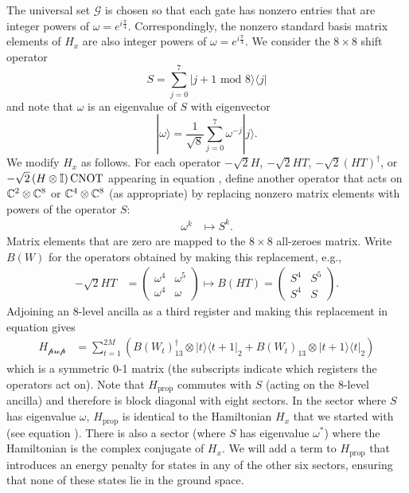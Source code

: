 \documentclass[../thesis-main/thesis-main]{subfiles}
\begin{document}
The universal set $\mathcal{G}$ is chosen so that each gate has nonzero entries that are integer powers of $\omega=e^{i\frac{\pi}{4}}$.  Correspondingly, the nonzero standard basis matrix elements of $H_{x}$ are also integer powers of $\omega=e^{i\frac{\pi}{4}}$. We consider the $8\times8$ shift operator
\[
S=\sum_{j=0}^{7}|j+1\text{ mod 8}\rangle\langle j|
\]
and note that $\omega$ is an eigenvalue of $S$ with eigenvector
\[
|\omega\rangle=\frac{1}{\sqrt{8}}\sum_{j=0}^{7}\omega^{-j}|j\rangle.
\]
We modify $H_{x}$ as follows. For each operator $-\sqrt{2}H$, $-\sqrt{2}HT$, $-\sqrt{2}(HT)^{\dagger}$, or $-\sqrt{2}\left(H\otimes\mathbb{I}\right)\mathrm{CNOT}$ appearing in equation , define another operator that acts on $\mathbb{C}^{2}\otimes\mathbb{C}^{8}$ or $\mathbb{C}^{4}\otimes\mathbb{C}^{8}$ (as appropriate) by replacing nonzero matrix elements with powers of the operator $S$:
\begin{align*}
\omega^{k} &\mapsto S^{k}.
\end{align*}
Matrix elements that are zero are mapped to the $8\times8$ all-zeroes matrix. Write $B(W)$ for the operators obtained by making this replacement, e.g., 
\begin{align*}
-\sqrt{2}HT & = \begin{pmatrix}
\omega^{4} & \omega^{5}\\
\omega^{4} & \omega
\end{pmatrix} \mapsto B(HT)=\begin{pmatrix}
S^{4} & S^{5}\\
S^{4} & S
\end{pmatrix}.
\end{align*}
Adjoining an 8-level ancilla as a third register and making this replacement in equation  gives 
\begin{align}
H_{\mathcal{\text{prop}}} & =\sum_{t=1}^{2M}\left(B(W_{t})^{\dagger}_{13}\otimes|t\rangle\langle t+1|_2+B(W_{t})_{13}\otimes|t+1\rangle\langle t|_2\right)\label{eq:Hprop-1}
\end{align}
which is a symmetric $0$-1 matrix (the subscripts indicate which registers the operators act on). Note that $H_{\text{prop}}$ commutes with $S$ (acting on the $8$-level ancilla) and therefore is block diagonal with eight sectors. In the sector where $S$ has eigenvalue $\omega$, $H_{\text{prop}}$ is identical to the Hamiltonian $H_x$ that we started with (see equation ). There is also a sector (where $S$ has eigenvalue $\omega^*$) where the Hamiltonian is the complex conjugate of $H_x$. We will add a term to $H_{\text{prop}}$ that introduces an energy penalty for states in any of the other six sectors, ensuring that none of these states lie in the ground space.
\end{document}
